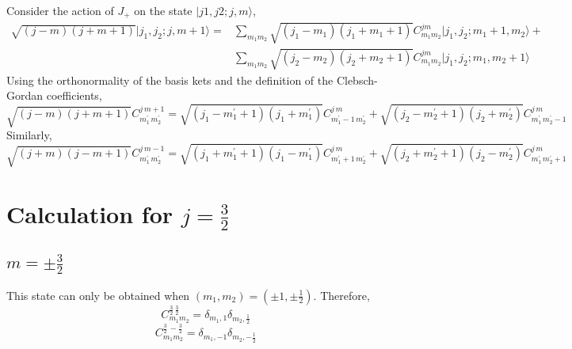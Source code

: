 \documentclass{article}
\begin{document}
Consider the action of $J_{+}$ on the state $| j1,j2;j,m \rangle$,
\begin{align*}
    \sqrt{(j-m)(j+m+1)}|j_{1},j_{2};j,m+1\rangle = & \sum_{m_{1} m_{2}} \sqrt{(j_{1}-m_{1})(j_{1}+m_{1}+1)} C^{jm}_{m_{1} m_{2}}| j_{1},j_{2};m_{1}+1,m_{2} \rangle + \\
    & \sum_{m_{1} m_{2}} \sqrt{(j_{2}-m_{2})(j_{2}+m_{2}+1)} C^{jm}_{m_{1} m_{2}}| j_{1},j_{2};m_{1},m_{2}+1 \rangle
\end{align*}
Using the orthonormality of the basis kets and the definition of the Clebsch-Gordan coefficients,
$$ \sqrt{(j-m)(j+m+1)} C^{j \, m+1}_{m^{\prime}_{1} \, m^{\prime}_{2}} = \sqrt{(j_{1}-m^{\prime}_{1}+1)(j_{1}+m^{\prime}_{1})} C^{j \, m}_{m^{\prime}_{1}-1 \, m^{\prime}_{2}} + \sqrt{(j_{2}-m^{\prime}_{2}+1)(j_{2}+m^{\prime}_{2})} C^{j \, m}_{m^{\prime}_{1} \, m^{\prime}_{2}-1}$$
Similarly,
$$ \sqrt{(j+m)(j-m+1)} C^{j \, m-1}_{m^{\prime}_{1} \, m^{\prime}_{2}} = \sqrt{(j_{1}+m^{\prime}_{1}+1)(j_{1}-m^{\prime}_{1})} C^{j \, m}_{m^{\prime}_{1}+1 \, m^{\prime}_{2}} + \sqrt{(j_{2}+m^{\prime}_{2}+1)(j_{2}-m^{\prime}_{2})} C^{j \, m}_{m^{\prime}_{1} \, m^{\prime}_{2}+1}$$
\section*{Calculation for $j=\frac{3}{2}$}
\subsection*{$m=\pm \frac{3}{2}$}
This state can only be obtained when $(m_{1},m_{2})=(\pm 1, \pm \frac{1}{2})$. Therefore, 
$$C^{\frac{3}{2} \,  \frac{3}{2}}_{m_{1}m_{2}} = \delta_{m_{1} ,1}\delta_{m_{2}, \frac{1}{2}}$$
$$C^{\frac{3}{2} \,  -\frac{3}{2}}_{m_{1}m_{2}} = \delta_{m_{1} ,-1}\delta_{m_{2}, -\frac{1}{2}}$$
\end{document}
